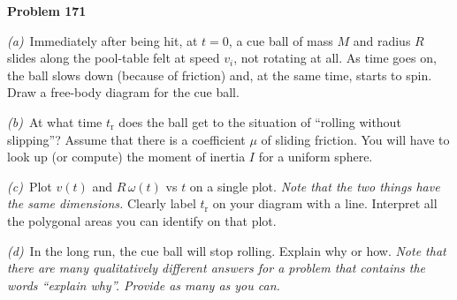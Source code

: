 \documentclass[12pt]{article}
\begin{document}
\pagecolor{mechanicscolor}\begin{pottproblem}
\textbf{Problem 171}

\textsl{(a)}~Immediately after being hit, at $t=0$, a cue ball of mass
$M$ and radius $R$ slides along the pool-table felt at speed $v_i$, not rotating
at all.  As time goes on, the ball slows down (because of friction)
and, at the same time, starts to spin.  Draw a free-body diagram for
the cue ball.

\textsl{(b)}~At what time $t_\mathrm{r}$ does the ball get to the
situation of ``rolling without slipping''?  Assume that there is a
coefficient $\mu$ of sliding friction. You will have to look up (or
compute) the moment of inertia $I$ for a uniform sphere.

\textsl{(c)}~Plot $v(t)$ and $R\,\omega(t)$ vs $t$ on a single plot.
\emph{Note that the two things have the same
dimensions.}  Clearly label $t_\mathrm{r}$ on your diagram with a
line.
Interpret all the polygonal areas you can identify on that plot.

\textsl{(d)}~In the long run, the cue ball will stop rolling. Explain
why or how. \emph{Note that there are many qualitatively different
answers for a problem that contains the words ``explain why''.
Provide as many as you can.}
\end{pottproblem}
\end{document}
